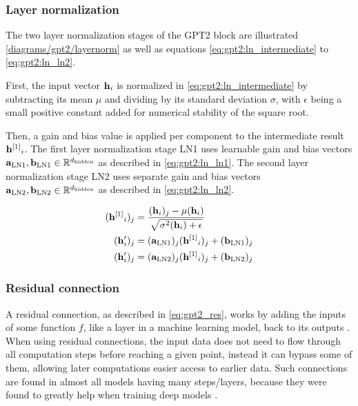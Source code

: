 \subsubsection{Layer normalization}
\label{gpt2:layernorm}

The two layer normalization stages of the GPT2 block are illustrated \cref{diagrams/gpt2/layernorm} as well as equations \eqref{eq:gpt2:ln_intermediate} to \eqref{eq:gpt2:ln_ln2}.

First, the input vector ${\mathbf{h}}_i$ is normalized in \cref{eq:gpt2:ln_intermediate} by subtracting its mean $\mu$ and dividing by its standard deviation $\sigma$, with $\epsilon$ being a small positive constant added for numerical stability of the square root.

Then, a gain and bias value is applied per component to the intermediate result ${{\mathbf{h}}^{[1]}}_i$. The first layer normalization stage LN1 uses learnable gain and bias vectors $\mathbf{a}_\mathrm{LN1}, \mathbf{b}_\mathrm{LN1} \in \mathbb{R}^{d_\textrm{hidden}}$ as described in \cref{eq:gpt2:ln_ln1}.
The second layer normalization stage LN2 uses separate gain and bias vectors $\mathbf{a}_\mathrm{LN2}, \mathbf{b}_\mathrm{LN2} \in \mathbb{R}^{d_\textrm{hidden}}$ as described in \cref{eq:gpt2:ln_ln2}.


\begin{align}
	({{\mathbf{h}}^{[1]}}_i)_j &= \frac
		{({\mathbf{h}}_i)_j - \mu({\mathbf{h}}_i)}
		{\sqrt {\sigma^2({\mathbf{h}}_i)+\epsilon}}
	\label{eq:gpt2:ln_intermediate}
	\\
	({\mathbf{h}}'_i)_j &= (\mathbf{a}_{\textrm{LN1}})_j ({{\mathbf{h}}^{[1]}}_i)_j + (\mathbf{b}_{\textrm{LN1}})_j
	\label{eq:gpt2:ln_ln1}
	\\
	({\mathbf{h}}'_i)_j &= (\mathbf{a}_{\textrm{LN2}})_j ({{\mathbf{h}}^{[1]}}_i)_j + (\mathbf{b}_{\textrm{LN2}})_j
	\label{eq:gpt2:ln_ln2}
\end{align}


\subsubsection{Residual connection}
\label{gpt2:residual}

A residual connection, as described in \cref{eq:gpt2_res}, works by adding the inputs of some function $f$, like a layer in a machine learning model, back to its outputs  \cite{residual}.
When using residual connections, the input data does not need to flow through all computation steps before reaching a given point, instead it can bypass some of them, allowing later computations easier access to earlier data.
Such connections are found in almost all models having many steps/layers, because they were found to greatly help when training deep models .

